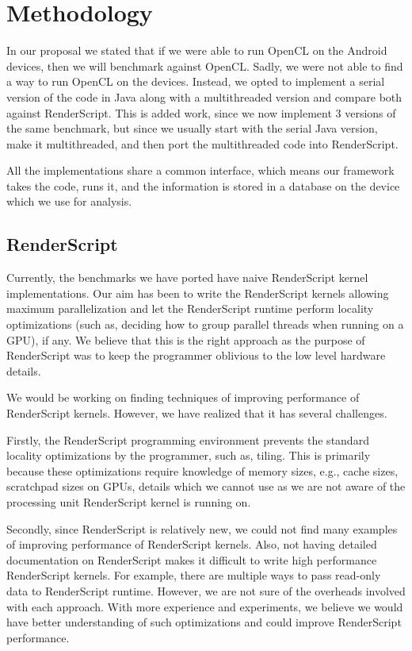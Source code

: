 
\section*{Methodology}

In our proposal we stated that if we were able to run OpenCL on the Android devices, then
  we will benchmark against OpenCL.
Sadly, we were not able to find a way to run OpenCL on the devices.
Instead, we opted to implement a serial version of the code in Java along with a multithreaded version
  and compare both against RenderScript.
This is added work, since we now implement 3 versions of the same benchmark, but since we usually
  start with the serial Java version, make it multithreaded, and then port the multithreaded code
  into RenderScript.

All the implementations share a common interface, which means our framework takes the code,
  runs it, and the information is stored in a database on the device which we use for analysis.

\subsection*{RenderScript}
Currently, the benchmarks we have ported have naive RenderScript kernel
implementations. Our aim has been to write the RenderScript kernels allowing maximum
parallelization and let the RenderScript runtime  perform locality
optimizations (such as, deciding how to group parallel threads when running on a
GPU), if any. We believe that this is the right approach as
the purpose of RenderScript was to keep the programmer oblivious to the low
level hardware details.

We would be working on finding techniques of improving performance of
RenderScript kernels. However, we have realized that it has several challenges.

Firstly, the RenderScript programming environment prevents the standard locality
optimizations by the programmer, such as, tiling. This is primarily because
these optimizations require knowledge of memory sizes, e.g., cache sizes,
scratchpad sizes on GPUs, details which we cannot use as we are not aware of the
processing unit RenderScript kernel is running on.

Secondly, since RenderScript is relatively new, we could not find many examples
of improving performance of RenderScript kernels. Also, not having detailed
documentation on RenderScript makes it difficult to write high performance
RenderScript kernels. For example, there are multiple ways to pass read-only
data to RenderScript runtime. However, we are not sure of the overheads involved
with each approach. With more experience and
experiments, we believe we would have better understanding of such optimizations
and could improve RenderScript performance.

